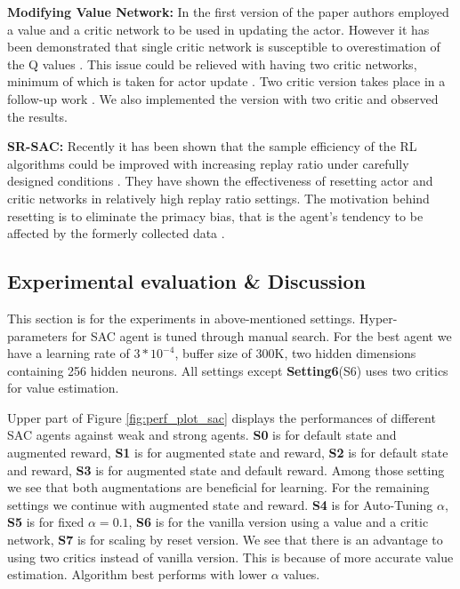 \textbf{Modifying Value Network:} In the first version of the paper \cite{HaarnojaAbbeelLevine2018:SAC} authors employed a value and a critic network to be used in updating the actor. However it has been demonstrated that single critic network is susceptible to overestimation of the Q values \cite{lillicrap16ddpg}. This issue could be relieved with having two critic networks, minimum of which is taken for actor update \cite{fujimoto2018:TD3}. Two critic version takes place in a follow-up work \cite{haarnoja2019soft}. We also implemented the version with two critic and observed the results. 

\textbf{SR-SAC:} Recently it has been shown that the sample efficiency of the RL algorithms could be improved with increasing replay ratio under carefully designed conditions \cite{d'oro2023sampleefficient}. They have shown the effectiveness of resetting actor and critic networks in relatively high replay ratio settings. The motivation behind resetting is to eliminate the primacy bias, that is the agent's tendency to be affected by the formerly collected data \cite{nikishin2022primacy}. 

\subsection{Experimental evaluation \& Discussion}
\label{sac_results}

This section is for the experiments in above-mentioned settings. Hyper-parameters for SAC agent is tuned through manual search. For the best agent we have a learning rate of $3*10^{-4}$, buffer size of 300K, two hidden dimensions containing 256 hidden neurons. All settings except \textbf{Setting6}(S6) uses two critics for value estimation.

Upper part of Figure \ref{fig:perf_plot_sac} displays the performances of different SAC agents against weak and strong agents. \textbf{S0} is for default state and augmented reward, 
\textbf{S1} is for augmented state and  reward, \textbf{S2} is for default state and reward, \textbf{S3} is for augmented state and default reward. Among those setting we see that both augmentations are beneficial for learning. For the remaining settings we continue with augmented state and reward. \textbf{S4} is for Auto-Tuning $\alpha$, \textbf{S5} is for fixed $\alpha=0.1$, \textbf{S6} is for the vanilla version using a value and a critic network, \textbf{S7} is for scaling by reset version. We see that there is an advantage to using two critics instead of vanilla version. This is because of more accurate value estimation. Algorithm best performs with lower $\alpha$ values.  

